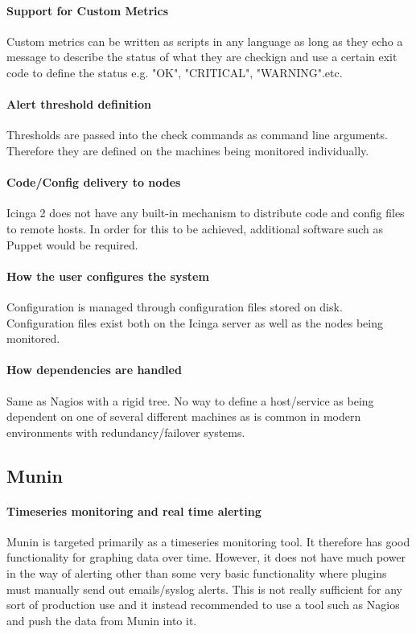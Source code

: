 \documentclass[bsc,logo,twoside]{infthesis}
\begin{document}
\paragraph*{Support for Custom Metrics}
Custom metrics can be written as scripts in any language as long as they echo a
message to describe the status of what they are checkign and use a certain exit
code to define the status e.g. "OK", "CRITICAL", "WARNING".etc.

\paragraph*{Alert threshold definition}
Thresholds are passed into the check commands as command line arguments.
Therefore they are defined on the machines being monitored individually.

\paragraph*{Code/Config delivery to nodes}
Icinga 2 does not have any built-in mechanism to distribute code and config
files to remote hosts. In order for this to be achieved, additional software
such as Puppet would be required.

\paragraph*{How the user configures the system}
Configuration is managed through configuration files stored on disk.
Configuration files exist both on the Icinga server as well as the nodes being
monitored.

\paragraph*{How dependencies are handled}
Same as Nagios with a rigid tree.  No way to define a host/service as being
dependent on one of several different machines as is common in modern
environments with redundancy/failover systems.

\subsection{Munin}
\paragraph*{Timeseries monitoring and real time alerting}
Munin is targeted primarily as a timeseries monitoring tool.  It therefore has
good functionality for graphing data over time.  However, it does not have much
power in the way of alerting other than some very basic functionality where
plugins must manually send out emails/syslog alerts.  This is not really
sufficient for any sort of production use and it instead recommended to use a
tool such as Nagios and push the data from Munin into it.
\end{document}
